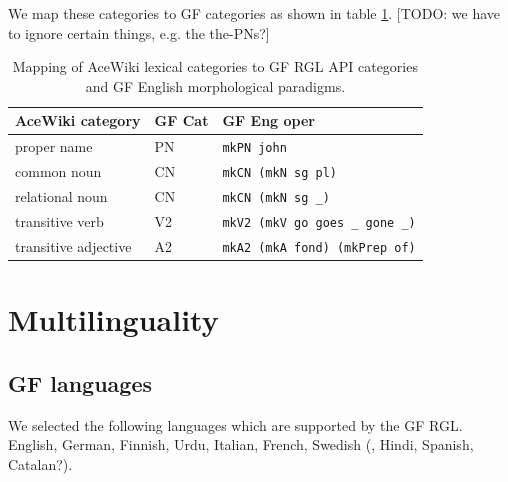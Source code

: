 \documentclass[a4paper]{article}
\def\xp#1{\texttt{#1}}
\begin{document}
We map these categories to GF categories as shown in
table \ref{mapping_acewiki_to_gf}.
[TODO: we have to ignore certain things, e.g.  the the-PNs?]

\begin{table}
\begin{center}
\caption{Mapping of AceWiki lexical categories
to GF RGL API categories and GF English
morphological paradigms.\protect\label{mapping_acewiki_to_gf}}
\begin{tabular}{ l l l }
\hline
AceWiki category & GF Cat & GF Eng oper \\
\hline
proper name & PN & \xp{mkPN john} \\
common noun & CN & \xp{mkCN (mkN sg pl)} \\
relational noun & CN & \xp{mkCN (mkN sg \_)} \\
transitive verb & V2 & \xp{mkV2 (mkV go goes \_ gone \_)} \\
transitive adjective & A2 & \xp{mkA2 (mkA fond) (mkPrep of)} \\
\hline
\end{tabular}
\end{center}
\end{table}

%
%

\section{Multilinguality}

\subsection{GF languages}

We selected the following languages which are supported by the GF RGL.
English, German, Finnish, Urdu, Italian, French, Swedish
(, Hindi, Spanish, Catalan?).
\end{document}
